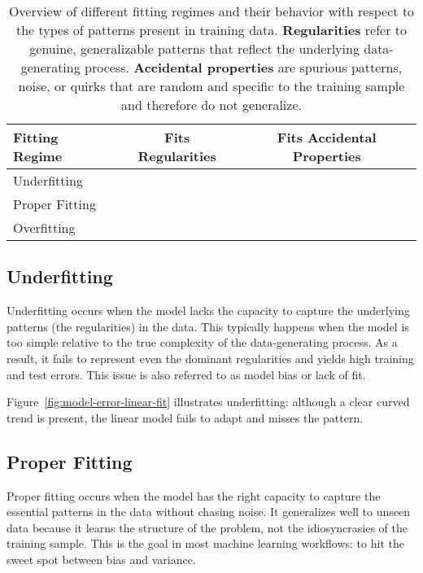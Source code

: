 \documentclass[12pt,openany]{book}
\newcommand{\cmark}{{\color{green!60!black}\ding{51}}} %
\newcommand{\xmark}{{\color{red!80!black}\ding{55}}}   %
\begin{document}
\begin{table}[H]
    \centering
    \small
    \caption{
        Overview of different fitting regimes and their behavior with respect to the types of patterns present in training data. 
        \textbf{Regularities} refer to genuine, generalizable patterns that reflect the underlying data-generating process.
        \textbf{Accidental properties} are spurious patterns, noise, or quirks that are random and specific to the training sample and therefore do not generalize.
        }
    \renewcommand{\arraystretch}{1.4}
    \begin{tabular}{|l|c|c|}
        \hline
        \textbf{Fitting Regime} & \textbf{Fits Regularities} & \textbf{Fits Accidental Properties} \\
        \hline
        Underfitting   & \xmark & \xmark \\
        Proper Fitting & \cmark & \xmark \\
        Overfitting    & \cmark & \cmark \\
        \hline
    \end{tabular}
\end{table}


\subsection{Underfitting}  \label{subsec:underfitting}

Underfitting occurs when the model lacks the capacity to capture the underlying patterns (the regularities) in the data. This typically happens when the model is too simple relative to the true complexity of the data-generating process. As a result, it fails to represent even the dominant regularities and yields high training and test errors. This issue is also referred to as model bias or lack of fit. \newline

Figure~\ref{fig:model-error-linear-fit} illustrates underfitting: although a clear curved trend is present, the linear model fails to adapt and misses the pattern.


\subsection{Proper Fitting}  \label{subsec:proper_fitting}

Proper fitting occurs when the model has the right capacity to capture the essential patterns in the data without chasing noise. It generalizes well to unseen data because it learns the structure of the problem, not the idiosyncrasies of the training sample. This is the goal in most machine learning workflows: to hit the sweet spot between bias and variance. \newline
\end{document}
